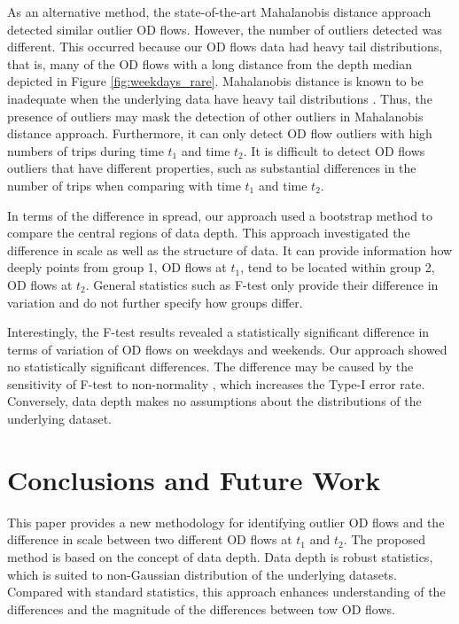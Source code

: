 \documentclass[a4paper,UKenglish]{lipics-v2018}
\begin{document}
As an alternative method, the state-of-the-art Mahalanobis distance approach  detected similar outlier OD flows. However, the number of outliers detected was different. This occurred because our OD flows data had heavy tail distributions, that is, many of the OD flows with a long distance from the depth median depicted in Figure \ref{fig:weekdays_rare}. Mahalanobis distance is known to be inadequate when the underlying data have heavy tail distributions \cite{wilcox12Book}. Thus, the presence of outliers may mask the detection of other outliers in Mahalanobis distance approach. Furthermore, it can only detect OD flow outliers with high numbers of trips during time $t_1$ and time $t_2$. It is difficult to detect OD flows outliers that have different properties, such as substantial differences in the number of trips when comparing with time $t_1$ and time $t_2$.

In terms of the difference in spread, our approach used a bootstrap method to compare the central regions of data depth. This approach investigated the difference in scale as well as the structure of data. It can provide information how deeply points from group 1, OD flows at $t_1$, tend to be located within group 2, OD flows at $t_2$. General statistics such as F-test only provide their difference in variation and do not further specify how groups differ. 

Interestingly, the F-test results revealed a statistically significant difference in terms of variation of OD flows on weekdays and weekends. Our approach showed no statistically significant differences. The difference may be caused by the sensitivity of F-test to non-normality  \cite{Field12book}, which increases the Type-I error rate. Conversely, data depth makes no assumptions about the distributions of the underlying dataset.

%


\section{Conclusions and Future Work}
\label{sec:conclusions}

This paper provides a new methodology for identifying outlier OD flows and the difference in scale between two different OD flows at $t_1$ and $t_2$. The proposed method is based on the concept of data depth. Data depth is robust statistics, which is suited to non-Gaussian distribution of the underlying datasets. Compared with standard statistics, this approach enhances understanding of the differences and the magnitude of the differences between tow OD flows. 
\end{document}
